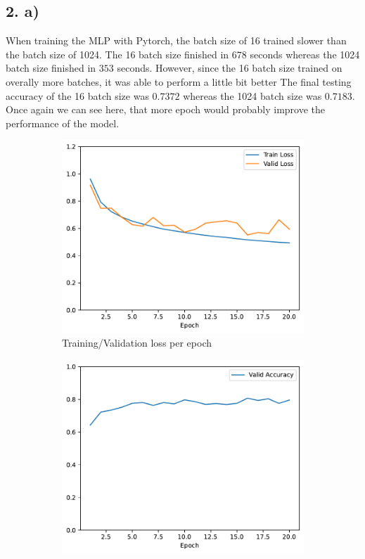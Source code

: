\documentclass[11pt]{article}
\begin{document}
\subsection{2. a)}
When training the MLP with Pytorch, the batch size of 16 trained slower than the batch size of 1024.
The 16 batch size finished in $678$ seconds whereas the 1024 batch size finished in $353$ seconds.
However, since the 16 batch size trained on overally more batches, it was able to perform a little bit better
The final testing accuracy of the 16 batch size was $0.7372$ whereas the 1024 batch size was $0.7183$.
Once again we can see here, that more epoch would probably improve the performance of the model.

\begin{figure}[h!]
\centering
\begin{subfigure}{.5\textwidth}
  \centering
  \includegraphics[width=.9\linewidth]{plots/mlp-training-loss-batch-16-lr-0.1-epochs-20-hidden-200-dropout-0-l2-0-layers-1-act-relu-opt-sgd}
  \caption{Training/Validation loss per epoch}
\end{subfigure}%
\begin{subfigure}{.5\textwidth}
  \centering
  \includegraphics[width=.9\linewidth]{plots/mlp-validation-accuracy-batch-16-lr-0.1-epochs-20-hidden-200-dropout-0-l2-0-layers-1-act-relu-opt-sgd}

\end{subfigure}
\end{figure}
\end{document}
